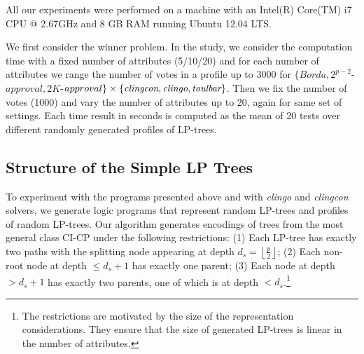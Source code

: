 All our experiments were performed on a machine with an 
Intel(R) Core(TM) i7 CPU @ 2.67GHz and 8 GB RAM running 
Ubuntu 12.04 LTS.  

We first consider the winner problem. In the study, we consider the 
computation time with a fixed number of attributes (5/10/20) and for each number of attributes we range 
the number of votes in a profile up to 3000 for $\{Borda, 2^{p-2}$-$approval, 
2K$-$approval\} \times \{\textit{clingcon}, \textit{clingo}, \textit{toulbar}\}$.  
Then we fix the number of votes (1000) and vary the number of attributes up to 20, again for 
same set of settings.  Each time 
result in seconds 
is computed as the mean of 20 tests over different randomly generated profiles of 
LP-trees.

\subsection{Structure of the Simple LP Trees}
To experiment with the programs presented above and with \emph{clingo} and
\emph{clingcon} solvers, we generate logic programs that represent 
random LP-trees and profiles of random
LP-trees.
Our algorithm generates encodings of trees from the most general class CI-CP 
under the following restrictions:
(1) Each LP-tree has exactly two paths with the splitting node appearing 
at depth $d_s=\left \lfloor \frac{p}{2} \right \rfloor$;
(2) Each non-root node at depth $\leq d_s+1$ has exactly one parent;
(3) Each 
node at depth $> d_s+1$ has exactly two parents, one of which 
is at depth $< d_s$.\footnote{
The restrictions are motivated by the size of the representation
considerations. They ensure that the size of generated LP-trees is 
linear in the number of attributes.}

